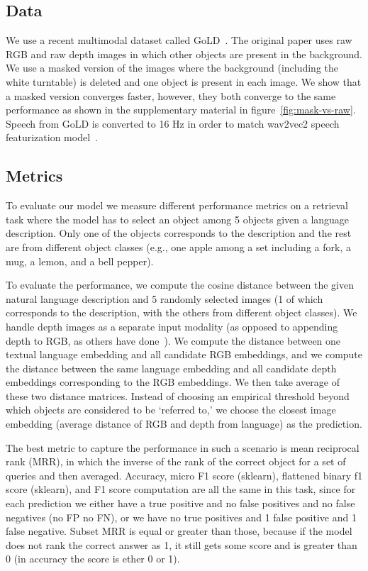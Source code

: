 \documentclass[sigconf,natbib=true,anonymous=true]{acmart}
\newcommand{\todokdinline}[1]{\todo[color=red!20,inline]{{KD: \small #1}}}
\begin{document}
\subsection{Data}
\label{sec:Data}

We use a recent multimodal dataset called GoLD~\cite{GoLD_UMBC}. The original paper uses raw RGB and raw depth images in which other objects are present in the background. We use a masked version of the images where the background (including the white turntable) is deleted and one object is present in each image. We show that a masked version converges faster, however, they both converge to the same performance as shown in the supplementary material in figure~\ref{fig:mask-vs-raw}. Speech from GoLD is converted to 16 Hz in order to match wav2vec2 speech featurization model~\cite{wav2vec2}.





\subsection{Metrics}
\label{sec:metrics}
To evaluate our model we measure different performance metrics on a retrieval task where the model has to select an object among 5 objects given a language description. Only one of the objects corresponds to the description and the rest are from different object classes (e.g., one apple among a set including a fork, a mug, a lemon, and a bell pepper).


To evaluate the performance, we compute the cosine distance between the given natural language description and 5 randomly selected images (1 of which corresponds to the description, with the others from different object classes). We handle depth images as a separate input modality (as opposed to appending depth to RGB, as others have done~\cite{triplet_loss_2021_CVPR}). We compute the distance between one textual language embedding and all candidate RGB embeddings, and we compute the distance between the same language embedding and all candidate depth embeddings corresponding to the RGB embeddings. We then take average of these two distance matrices. Instead of choosing an empirical threshold beyond which objects are considered to be `referred to,' we choose the closest image embedding (average distance of RGB and depth from language) as the prediction.

The best metric to capture the performance in such a scenario is mean reciprocal rank (MRR), in which the inverse of the rank of the correct object for a set of queries and then averaged. Accuracy, micro F1 score (sklearn), flattened binary f1 score (sklearn), and F1 score computation are all the same in this task, since for each prediction we either have a true positive and no false positives and no false negatives (no FP no FN), or we have no true positives and 1 false positive and 1 false negative. Subset MRR is equal or greater than those, because if the model does not rank the correct answer as 1, it still gets some score and is greater than 0 (in accuracy the score is ether 0 or 1).
\end{document}
